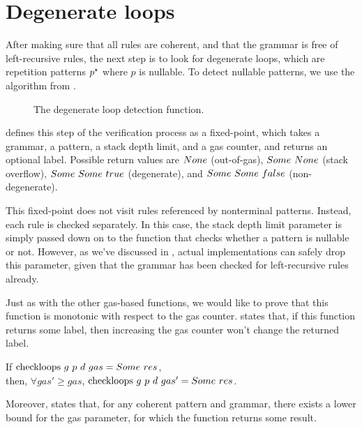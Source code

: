 \section{Degenerate loops}

After making sure that
all rules are coherent,
and that the grammar is free of left-recursive rules,
the next step is to look for degenerate loops,
which are repetition patterns $p^\star$
where $p$ is nullable.
To detect nullable patterns,
we use the algorithm from
.

\begin{figure}
    \centering
    
    \caption{The degenerate loop detection function.}
    \label{fig:checkloops-function}
\end{figure}
defines this step of the verification process
as a fixed-point,
which takes a grammar,
a pattern,
a stack depth limit,
and a gas counter,
and returns an optional label.
Possible return values are
$None$ (out-of-gas),
$Some\ None$ (stack overflow),
$Some\ Some\ true$ (degenerate),
and $Some\ Some\ false$ (non-degenerate).

This fixed-point does not visit rules
referenced by nonterminal patterns.
Instead, each rule is checked separately.
In this case, the stack depth limit parameter
is simply passed down on to the function that
checks whether a pattern is nullable or not.
However, as we've discussed in ,
actual implementations can safely drop this parameter,
given that the grammar has been checked
for left-recursive rules already.

Just as with the other gas-based functions,
we would like to prove that this function
is monotonic with respect to the gas counter.
states that, if this function returns some label,
then increasing the gas counter
won't change the returned label.

\begin{lemma}%
    If $\text{checkloops}\ g\ p\ d\ gas = Some\ res$, \\
    then, $\forall gas' \ge gas$,
    $\text{checkloops}\ g\ p\ d\ gas' = Some\ res$.
    \label{lemma:checkloops-gas-monotonicity}
\end{lemma}

Moreover, 
states that, for any coherent pattern and grammar,
there exists a lower bound for the gas parameter,
for which the function returns some result.

